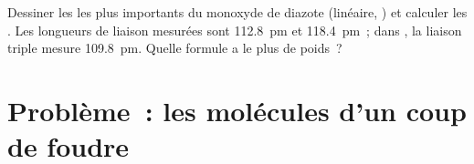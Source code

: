 \begin{exercise}[$\star\star\star$]\label{exo:b1:lewis-resonance-vsepr:12}
Dessiner les  les plus importants du monoxyde de diazote
 (linéaire, ) et calculer les . Les
longueurs de liaison mesurées sont  \qty{112.8}{pm} et 
\qty{118.4}{pm}~; dans , la liaison triple mesure
\qty{109.8}{pm}. Quelle formule a le plus de poids~?
\end{exercise}

\section{Problème~: les molécules d'un coup de foudre}

